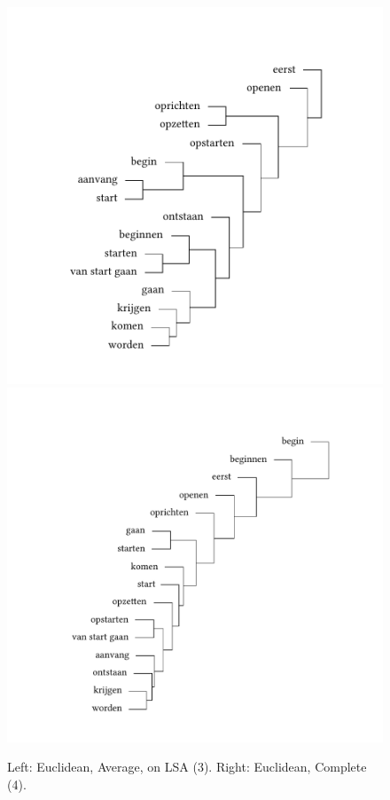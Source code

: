 \begin{figure}
\includegraphics[width=.48\textwidth,trim=95 40 75 75]{figures/tree32.pdf}\hfill%
\includegraphics[width=.48\textwidth,trim=95 40 75 75]{figures/tree33.pdf}
\caption{Left:\label{fig:3:32} Euclidean, Average, on LSA (3). Right:\label{fig:3:33}  Euclidean, Complete (4).}
\end{figure}

